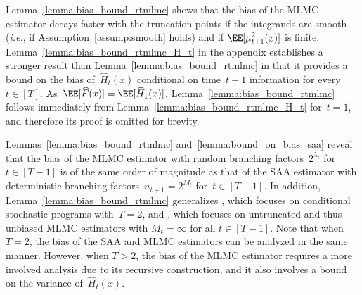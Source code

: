 \documentclass[11pt]{article}
\let\hat\widehat
\begin{document}

Lemma~\ref{lemma:bias_bound_rtmlmc} shows that the bias of the MLMC estimator decays faster with the truncation points if the integrands are smooth ({\em i.e.}, if Assumption~\ref{assump:smooth} holds) and if $\EE[\mu_{t+1}^2(x)]$ is finite. Lemma~\ref{lemma:bias_bound_rtmlmc_H_t} in the appendix establishes a stronger result than Lemma~\ref{lemma:bias_bound_rtmlmc} in that it provides a bound on the bias of~$\hat H_t(x)$ conditional on time~$t-1$ information for every~$t\in[T]$. As~$\EE[\hat{F}(x)]=\EE[\hat{H}_1(x)]$, Lemma~\ref{lemma:bias_bound_rtmlmc} follows immediately from Lemma~\ref{lemma:bias_bound_rtmlmc_H_t} for~$t=1$, and therefore its proof is omitted for brevity.

Lemmas~\ref{lemma:bias_bound_rtmlmc} and~\ref{lemma:bound_on_bias_saa} reveal that the bias of the MLMC estimator with random branching factors~$2^{\lambda_t}$ for~$t \in [T-1]$ is of the same order of magnitude as that of the SAA estimator with deterministic branching factors~$n_{t+1}= 2^{M_t}$ for~$t \in [T-1]$. In addition, Lemma~\ref{lemma:bias_bound_rtmlmc} generalizes \cite[Proposition 4.1]{hu2021bias}, which focuses on conditional stochastic programs with~$T=2$, and \cite[Theorem~2.2]{syed2023optimal}, which focuses on untruncated and thus unbiased MLMC estimators with $M_t=\infty$ for all $t\in[T-1]$. Note that when~$T=2$, the bias of the SAA and MLMC estimators can be analyzed in the same manner. However, when $T>2$, the bias of the MLMC estimator requires a more involved analysis due to its recursive construction, and it also involves a bound on the variance of~$\hat H_t(x)$.
\end{document}
